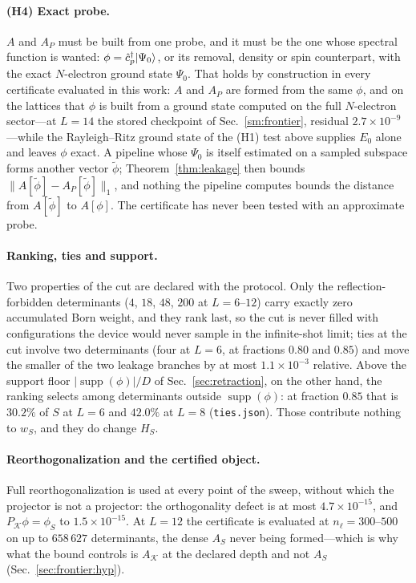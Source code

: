 \paragraph{(H4) Exact probe.} $A$ and $A_P$ must be built from one probe, and it must be the one whose
spectral function is wanted: $\phi=\hat c^{\dagger}_p\lvert \Psi_0 \rangle$, or its removal, density or spin
counterpart, with the exact $N$-electron ground state $\Psi_0$. That holds by construction in every
certificate evaluated in this work: $A$ and $A_P$ are formed from the same $\phi$, and on the lattices
that $\phi$ is built from a ground state computed on the full $N$-electron sector---at $L=14$ the stored
checkpoint of Sec.~\ref{sm:frontier}, residual $2.7\times10^{-9}$---while the Rayleigh--Ritz ground
state of the (H1) test above supplies $E_0$ alone and leaves $\phi$ exact. A pipeline whose $\Psi_0$ is
itself estimated on a sampled subspace forms another vector $\tilde\phi$; Theorem~\ref{thm:leakage} then
bounds $\lVert A[\tilde\phi]-A_P[\tilde\phi]\rVert_1$, and nothing the pipeline computes bounds the
distance from $A[\tilde\phi]$ to $A[\phi]$. The certificate has never been tested with an approximate
probe.

\paragraph{Ranking, ties and support.} Two properties of the cut are declared with the protocol. Only the reflection-forbidden determinants ($4$, $18$, $48$, $200$ at $L=6$--$12$) carry exactly zero accumulated Born weight, and they rank last, so the cut is never filled with configurations the
device would never sample in the infinite-shot limit; ties at the cut involve two determinants (four
at $L=6$, at fractions $0.80$ and $0.85$) and move the smaller of the two leakage branches by at most
$1.1\times10^{-3}$ relative.
Above the support floor $\lvert\operatorname{supp}(\phi)\rvert/D$ of Sec.~\ref{sec:retraction}, on the other hand, the
ranking selects among determinants outside $\operatorname{supp}(\phi)$: at fraction $0.85$ that is
$30.2\%$ of $S$ at $L=6$ and $42.0\%$ at $L=8$ (\texttt{ties.json}). Those contribute nothing
to $w_S$, and they do change $H_S$.

\paragraph{Reorthogonalization and the certified object.} Full reorthogonalization is used at every
point of the sweep, without which the projector is not a projector: the orthogonality defect is at
most $4.7\times10^{-15}$, and $P_{\mathcal K}\phi=\phi_S$ to $1.5\times10^{-15}$. At $L=12$ the
certificate is evaluated at $n_\ell=300$--$500$ on up to $658\,627$ determinants, the dense $A_S$
never being formed---which is why what the bound controls is $A_{\mathcal K}$ at the declared depth
and not $A_S$ (Sec.~\ref{sec:frontier:hyp}).

